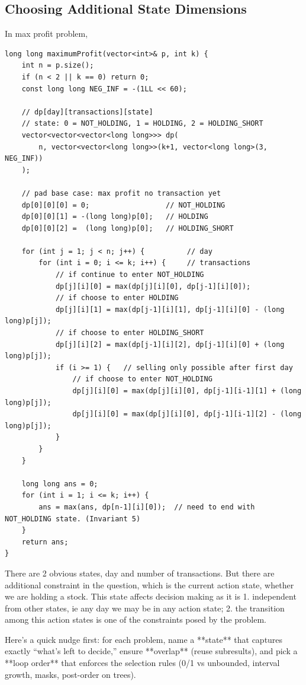 \documentclass[9pt]{extarticle}
\begin{document}
\subsection{Choosing Additional State Dimensions}
In max profit problem, 
\begin{lstlisting}
long long maximumProfit(vector<int>& p, int k) {
    int n = p.size();
    if (n < 2 || k == 0) return 0;
    const long long NEG_INF = -(1LL << 60);

    // dp[day][transactions][state]
    // state: 0 = NOT_HOLDING, 1 = HOLDING, 2 = HOLDING_SHORT
    vector<vector<vector<long long>>> dp(
        n, vector<vector<long long>>(k+1, vector<long long>(3, NEG_INF))
    );

    // pad base case: max profit no transaction yet
    dp[0][0][0] = 0;                  // NOT_HOLDING
    dp[0][0][1] = -(long long)p[0];   // HOLDING
    dp[0][0][2] =  (long long)p[0];   // HOLDING_SHORT

    for (int j = 1; j < n; j++) {          // day
        for (int i = 0; i <= k; i++) {     // transactions
            // if continue to enter NOT_HOLDING
            dp[j][i][0] = max(dp[j][i][0], dp[j-1][i][0]);
            // if choose to enter HOLDING
            dp[j][i][1] = max(dp[j-1][i][1], dp[j-1][i][0] - (long long)p[j]);
            // if choose to enter HOLDING_SHORT
            dp[j][i][2] = max(dp[j-1][i][2], dp[j-1][i][0] + (long long)p[j]);
            if (i >= 1) {   // selling only possible after first day
                // if choose to enter NOT_HOLDING
                dp[j][i][0] = max(dp[j][i][0], dp[j-1][i-1][1] + (long long)p[j]);
                dp[j][i][0] = max(dp[j][i][0], dp[j-1][i-1][2] - (long long)p[j]);
            }
        }
    }

    long long ans = 0;
    for (int i = 1; i <= k; i++) {
        ans = max(ans, dp[n-1][i][0]);  // need to end with NOT_HOLDING state. (Invariant 5)
    }
    return ans;
}
\end{lstlisting}
There are 2 obvious states, day and number of transactions. But there are additional constraint in the question, which
is the current action state, whether we are holding a stock. This state affects decision making as it is 1. independent from
other states, ie any day we may be in any action state; 2. the transition among this action states is one of the constraints 
posed by the problem. 

Here’s a quick nudge first: for each problem, name a **state** that captures exactly “what’s left to decide,” ensure **overlap** (reuse subresults), and pick a **loop order** that enforces the selection rules (0/1 vs unbounded, interval growth, masks, post-order on trees).
\end{document}
